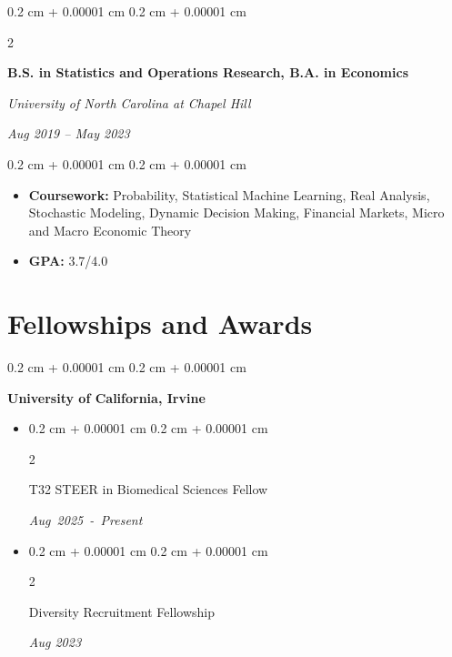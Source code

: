 \documentclass[10pt, letterpaper]{article}
\newenvironment{highlights}{
    \begin{itemize}[
        topsep=0.05 cm,
        parsep=0.05 cm,
        partopsep=0pt,
        itemsep=0pt,
        leftmargin=0.4 cm + 10pt
    ]
}{
    \end{itemize}
} %
\newenvironment{onecolentry}{
    \begin{adjustwidth}{
        0.2 cm + 0.00001 cm
    }{
        0.2 cm + 0.00001 cm
    }
}{
    \end{adjustwidth}
} %
\newenvironment{twocolentry}[2][]{
    \onecolentry
    \def\secondColumn{#2}
    \setcolumnwidth{\fill, 4.5 cm}
    \begin{paracol}{2}
}{
    \switchcolumn \raggedleft \secondColumn
    \end{paracol}
    \endonecolentry
} %
\begin{document}
        \vspace{0.05 cm}
        
        \begin{twocolentry}{
        \textit{Aug 2019 – May 2023}}
            \textbf{B.S. in Statistics and Operations Research, B.A. in Economics}

            \textit{University of North Carolina at Chapel Hill}
        \end{twocolentry}
        
        \vspace{0.05 cm}
        \begin{onecolentry}
            \begin{highlights}
                \item \textbf{Coursework:} 
                Probability, Statistical Machine Learning, Real Analysis, Stochastic Modeling, Dynamic Decision Making, Financial Markets, Micro and Macro Economic Theory
                \item \textbf{GPA:} 3.7/4.0 
            \end{highlights}
            
        \end{onecolentry}

        \vspace{-0.0cm}

\section{Fellowships and Awards}
    \begin{onecolentry}
        \textbf{University of California, Irvine}
        \begin{highlights}
            \item \begin{twocolentry}{\textit{Aug~2025~-~Present}}
                    T32 STEER in Biomedical Sciences Fellow
                  \end{twocolentry}
            \item \begin{twocolentry}{\textit{Aug 2023}}
                    Diversity Recruitment Fellowship
                  \end{twocolentry}
        \end{highlights}
    \end{onecolentry}

\vspace{-0.0cm}
\end{document}
